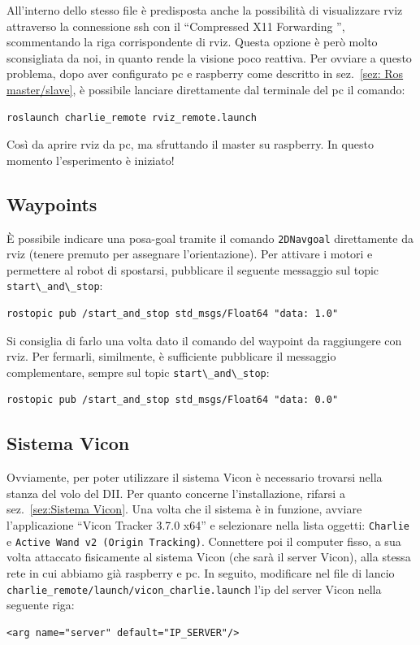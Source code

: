 All'interno dello stesso file è predisposta anche la possibilità di visualizzare rviz attraverso la connessione ssh con il ``Compressed X11 Forwarding '', scommentando la riga corrispondente di rviz. Questa opzione è però molto sconsigliata da noi, in quanto rende la visione poco reattiva. Per ovviare a questo problema, dopo aver configurato pc e raspberry come descritto in sez.~\ref{sez: Ros master/slave}, è possibile lanciare direttamente dal terminale del pc il comando:

\begin{lstlisting}[style=bashPC]
	roslaunch charlie_remote rviz_remote.launch
\end{lstlisting}
Così da aprire rviz da pc, ma sfruttando il master su raspberry.
In questo momento l'esperimento è iniziato!

\subsection*{Waypoints}
\`E possibile indicare una posa-goal tramite il comando \texttt{2DNavgoal} direttamente da rviz (tenere premuto per assegnare l'orientazione).
Per attivare i motori e permettere al robot di spostarsi, pubblicare il seguente messaggio sul topic \verb|start\_and\_stop|:

\begin{lstlisting}[style=bash]
	rostopic pub /start_and_stop std_msgs/Float64 "data: 1.0"
\end{lstlisting}
Si consiglia di farlo una volta dato il comando del waypoint da raggiungere con rviz.
Per fermarli, similmente, è sufficiente pubblicare il messaggio complementare, sempre sul topic \verb|start\_and\_stop|:

\begin{lstlisting}[style=bash]
	rostopic pub /start_and_stop std_msgs/Float64 "data: 0.0"
\end{lstlisting}

\subsection*{Sistema Vicon}
Ovviamente, per poter utilizzare il sistema Vicon è necessario trovarsi nella stanza del volo del DII. 
Per quanto concerne l'installazione, rifarsi a sez.~\ref{sez:Sistema Vicon}. 
Una volta che il sistema è in funzione, avviare l'applicazione ``Vicon Tracker 3.7.0 x64'' e selezionare nella lista oggetti: \texttt{Charlie} e \texttt{Active Wand v2 (Origin Tracking)}. 
Connettere poi il computer fisso, a sua volta attaccato fisicamente al sistema Vicon (che sarà il server Vicon), alla stessa rete in cui abbiamo già raspberry e pc. In seguito, modificare nel file di lancio \texttt{charlie\_remote/launch/vicon\_charlie.launch} l'ip del server Vicon nella seguente riga:
\begin{lstlisting}[style=xml, firstnumber=6]
	<arg name="server" default="IP_SERVER"/>
\end{lstlisting}

